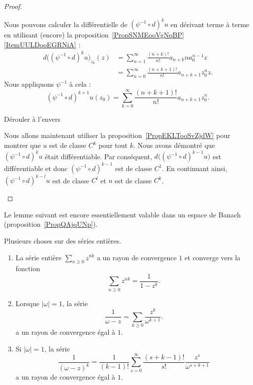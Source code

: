 \begin{proof}
\begin{subproof}
		Nous pouvons calculer la différentielle de \( (\psi^{-1}\circ d)^ku\) en dérivant terme à terme en utilisant (encore) la proposition~\ref{PropSNMEooVgNqBP}\ref{ItemUULDooEGRNiA} :
		\begin{subequations}
			\begin{align}
				d\big( (\psi^{-1}\circ d)^k u\big)_{z_0}(z) & =\sum_{n=1}^{\infty}\frac{ (n+k)! }{ n! }a_{n+k}na_{0}^{n-1}z \\
				                                            & =\sum_{n=0}^{\infty}\frac{ (n+k+1)! }{ n! }a_{n+k+1}z_{0}^nz.
			\end{align}
		\end{subequations}
		Nous appliquons \( \psi^{-1}\) à cela :
		\begin{equation}
			(\psi^{-1}\circ d)^{k+1}u(z_0)=\sum_{k=0}^{\infty}\frac{ (n+k+1)! }{ n! }a_{n+k+1}z_0^n.
		\end{equation}

		\item[Dérouler à l'envers]

		Nous allons maintenant utiliser la proposition~\ref{PropEKLTooSvZjdW} pour montrer que \( u\) est de classe \( C^k\) pour tout \( k\). Nous avons démontré que \( (\psi^{-1}\circ d)^ku\) était différentiable. Par conséquent, \( d\big( (\psi^{-1}\circ d)^{k-1}u \big)\) est différentiable et donc \( (\psi^{-1}\circ d)^{k-1}\) est de classe \( C^1\). En continuant ainsi, \( (\psi^{-1}\circ d)^{k-l}u\) est de classe \( C^l\) et \( u\) est de classe \( C^k\).
	\end{subproof}
\end{proof}

Le lemme suivant est encore essentiellement valable dans un espace de Banach (proposition~\ref{PropQAjqUNp}).
\begin{lemma}       \label{LemPQFDooGUPBvF}
	Plusieurs choses sur des séries entières.
	\begin{enumerate}
		\item
		      La série entière \( \sum_{n\geq 0}z^{nk}\) a un rayon de convergence \( 1\) et converge vers la fonction
		      \begin{equation}
			      \sum_{n\geq 0}z^{nk}=\frac{1}{ 1-z^k }.
		      \end{equation}
		\item
		      Lorsque \( | \omega |=1\), la série
		      \begin{equation}        \label{EqSSHZooLwCBAZ}
			      \frac{1}{ \omega-z }=\sum_{k\geq 0}\frac{ z^k }{ \omega^{k+1} }.
		      \end{equation}
		      a un rayon de convergence égal à \( 1\).
		\item   \label{ITEMooHFVHooPCgzZV}
		      Si \( | \omega |=1\), la série
		      \begin{equation}
			      \frac{1}{ (\omega-z)^k }=\frac{1}{ (k-1)! }\sum_{s=0}^{\infty}\frac{ (s+k-1)! }{ s! }\frac{ z^s }{ \omega^{s+k+1} }
		      \end{equation}
		      a un rayon de convergence égal à \( 1\).
	\end{enumerate}
\end{lemma}

